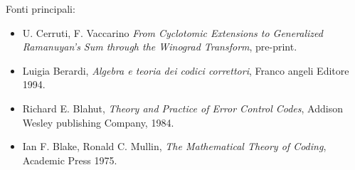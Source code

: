 \documentclass[mathserif]{beamer}
\begin{document}
\thispagestyle{empty}
\begin{frame}
Fonti principali:
    \begin{itemize}
      \item U. Cerruti, F. Vaccarino \emph{From Cyclotomic Extensions to Generalized
	    Ramanuyan's Sum through the Winograd Transform}, pre-print.
      \item Luigia Berardi, \emph{Algebra e teoria dei codici correttori}, Franco angeli
	    Editore 1994.
      \item Richard E. Blahut, \emph{Theory and Practice of Error Control Codes},
	    Addison Wesley publishing Company, 1984.
      \item Ian F. Blake, Ronald C. Mullin, \emph{The Mathematical Theory of Coding},
	    Academic Press 1975.

    \end{itemize}
\end{frame}
\end{document}

